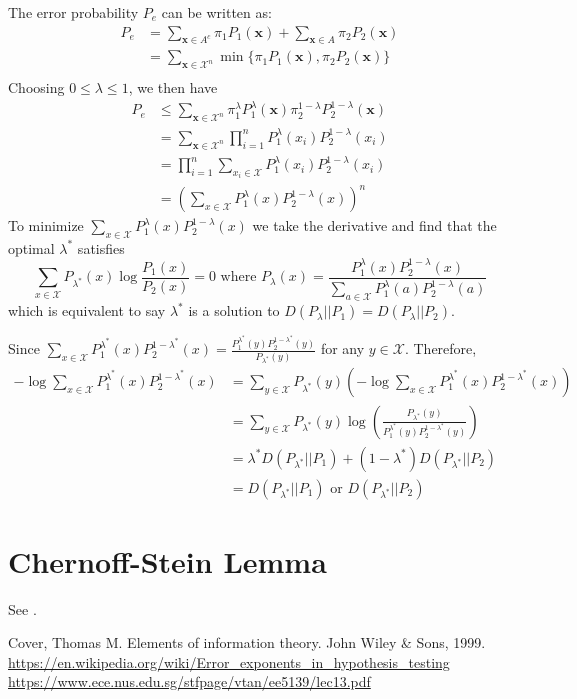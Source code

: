 \documentclass{article}
\begin{document}
The error probability $P_e$ can be written as:
\begin{align*}
P_e & = \sum_{\bm{x} \in A^c} \pi_1 P_1(\bm{x})
+ \sum_{\bm{x} \in A} \pi_2 P_2(\bm{x}) \\
& = \sum_{\bm{x} \in \mathcal{X}^n} \min \{ \pi_1 P_1(\bm{x}), \pi_2 P_2(\bm{x})\} \\
\end{align*}
Choosing $ 0 \leq \lambda \leq 1 $,
we then have
\begin{align*}
P_e & \leq \sum_{\bm{x} \in \mathcal{X}^n}  \pi_1^{\lambda} P_1^{\lambda}(\bm{x}) \pi_2^{1-\lambda} P_2^{1-\lambda}(\bm{x}) \\
& =  \sum_{\bm{x} \in \mathcal{X}^n}  \prod_{i=1}^n P_1^{\lambda}(x_i)  P_2^{1-\lambda}(x_i) \\
& = \prod_{i=1}^n \sum_{x_i\in \mathcal{X}} P_1^{\lambda}(x_i)  P_2^{1-\lambda}(x_i) \\
& = \left(\sum_{x\in \mathcal{X}} P_1^{\lambda}(x)  P_2^{1-\lambda}(x)\right)^n
\end{align*}
To minimize $\sum_{x\in \mathcal{X}} P_1^{\lambda}(x)  P_2^{1-\lambda}(x)$ we take the derivative
and find that the optimal $\lambda^*$ satisfies
\begin{equation}
\sum_{x\in \mathcal{X}} P_{\lambda^*}(x) \log \frac{P_1(x)}{P_2(x)} = 0 \textrm{ where }
P_{\lambda}(x) = \frac{P_1^{\lambda}(x)P_2^{1-\lambda}(x)}{\sum_{a\in \mathcal{X}}P_1^{\lambda}(a)P_2^{1-\lambda}(a)}
\end{equation}
which is equivalent to say $\lambda^*$ is a solution to $D(P_{\lambda}|| P_1) = D(P_{\lambda} || P_2)$.

Since $\sum_{x\in \mathcal{X}} P_1^{\lambda^*}(x)  P_2^{1-\lambda^*}(x) = \frac{P_1^{\lambda^*}(y)P_2^{1-\lambda^*}(y)}
{P_{\lambda^*}(y)}$ for any $y\in \mathcal{X}$. Therefore,
\begin{align*}
-\log \sum_{x\in \mathcal{X}} P_1^{\lambda^*}(x)  P_2^{1-\lambda^*}(x) &= \sum_{y \in \mathcal{X}} P_{\lambda^*}(y) \left(-\log \sum_{x\in \mathcal{X}} P_1^{\lambda^*}(x)  P_2^{1-\lambda^*}(x) \right)\\
& = \sum_{y \in \mathcal{X}} P_{\lambda^*}(y) \log\left(\frac{P_{\lambda^*}(y)}{P_1^{\lambda^*}(y)P_2^{1-\lambda^*}(y)}\right) \\
& = \lambda^* D(P_{\lambda^*} || P_1) + (1-\lambda^*) D(P_{\lambda^*} || P_2) \\
& = D(P_{\lambda^*} || P_1) \textrm{ or } D(P_{\lambda^*} || P_2)
\end{align*}
\section{Chernoff-Stein Lemma}
See \cite{stein}.
\begin{thebibliography}{9}
	 Cover, Thomas M. Elements of information theory. John Wiley \& Sons, 1999.
	 \url{https://en.wikipedia.org/wiki/Error_exponents_in_hypothesis_testing}
	 \url{https://www.ece.nus.edu.sg/stfpage/vtan/ee5139/lec13.pdf}
\end{thebibliography}
\end{document}
